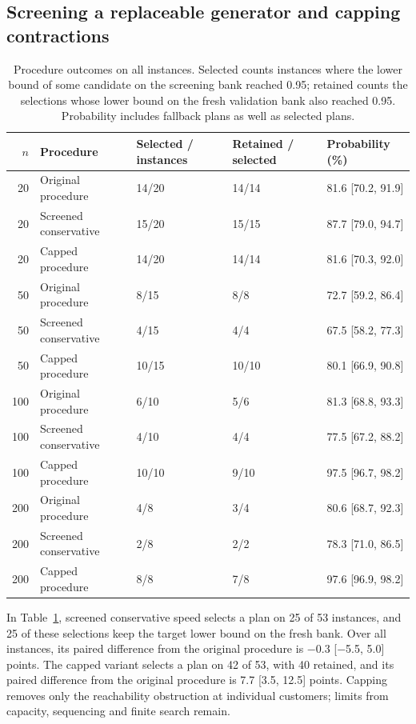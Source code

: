 \subsection{Screening a replaceable generator and capping contractions}

\begin{table}[htbp]
\centering
\small
\caption{Procedure outcomes on all instances. Selected counts instances where the lower bound of some candidate on the screening bank reached 0.95; retained counts the selections whose lower bound on the fresh validation bank also reached 0.95. Probability includes fallback plans as well as selected plans.}
\label{tab:screen}
\begin{tabular}{rllll}
\toprule
$n$ & Procedure & Selected / instances & Retained / selected & Probability (\%)\\
\midrule
20 & Original procedure & 14/20 & 14/14 & 81.6 [70.2, 91.9]\\
20 & Screened conservative & 15/20 & 15/15 & 87.7 [79.0, 94.7]\\
20 & Capped procedure & 14/20 & 14/14 & 81.6 [70.3, 92.0]\\
50 & Original procedure & 8/15 & 8/8 & 72.7 [59.2, 86.4]\\
50 & Screened conservative & 4/15 & 4/4 & 67.5 [58.2, 77.3]\\
50 & Capped procedure & 10/15 & 10/10 & 80.1 [66.9, 90.8]\\
100 & Original procedure & 6/10 & 5/6 & 81.3 [68.8, 93.3]\\
100 & Screened conservative & 4/10 & 4/4 & 77.5 [67.2, 88.2]\\
100 & Capped procedure & 10/10 & 9/10 & 97.5 [96.7, 98.2]\\
200 & Original procedure & 4/8 & 3/4 & 80.6 [68.7, 92.3]\\
200 & Screened conservative & 2/8 & 2/2 & 78.3 [71.0, 86.5]\\
200 & Capped procedure & 8/8 & 7/8 & 97.6 [96.9, 98.2]\\
\bottomrule
\end{tabular}
\end{table}


In Table~\ref{tab:screen}, screened conservative speed selects a plan on 25 of 53 instances, and 25 of these selections keep the target lower bound on the fresh bank. Over all instances, its paired difference from the original procedure is $-$0.3 [$-$5.5, 5.0] points. The capped variant selects a plan on 42 of 53, with 40 retained, and its paired difference from the original procedure is 7.7 [3.5, 12.5] points. Capping removes only the reachability obstruction at individual customers; limits from capacity, sequencing and finite search remain.

